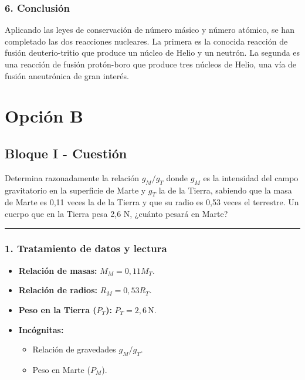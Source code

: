 \subsubsection*{6. Conclusión}
\begin{cajaconclusion}
Aplicando las leyes de conservación de número másico y número atómico, se han completado las dos reacciones nucleares. La primera es la conocida reacción de fusión deuterio-tritio que produce un núcleo de Helio y un neutrón. La segunda es una reacción de fusión protón-boro que produce tres núcleos de Helio, una vía de fusión aneutrónica de gran interés.
\end{cajaconclusion}
\newpage

\section{Opción B}
\label{sec:B_2017_jul_ext}

\subsection{Bloque I - Cuestión}
\label{subsec:B1_2017_jul_ext}

\begin{cajaenunciado}
Determina razonadamente la relación $g_{M}/g_{T}$ donde $g_{M}$ es la intensidad del campo gravitatorio en la superficie de Marte y $g_{T}$ la de la Tierra, sabiendo que la masa de Marte es 0,11 veces la de la Tierra y que su radio es 0,53 veces el terrestre. Un cuerpo que en la Tierra pesa 2,6 N, ¿cuánto pesará en Marte?
\end{cajaenunciado}
\hrule

\subsubsection*{1. Tratamiento de datos y lectura}
\begin{itemize}
    \item \textbf{Relación de masas:} $M_M = 0,11 M_T$.
    \item \textbf{Relación de radios:} $R_M = 0,53 R_T$.
    \item \textbf{Peso en la Tierra ($P_T$):} $P_T = 2,6\,\text{N}$.
    \item \textbf{Incógnitas:}
    \begin{itemize}
        \item Relación de gravedades $g_M/g_T$.
        \item Peso en Marte ($P_M$).
    \end{itemize}
\end{itemize}

